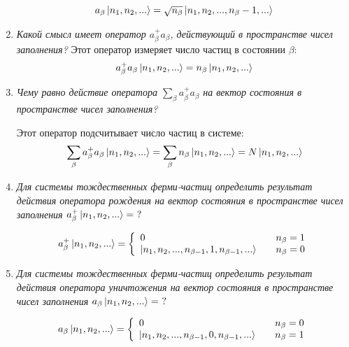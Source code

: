 \documentclass{article}
\begin{document}
\begin{enumerate}
	\begin{equation}
		a_\beta \ket{n_1, n_2, ...} = \sqrt{n_\beta} \ket{n_1, n_2, ..., n_\beta -1,...}
	\end{equation}
	
	\item \textit{Какой смысл имеет оператор $a^+_\beta a_\beta$, действующий в пространстве чисел заполнения?}
	Этот оператор измеряет число частиц в состоянии $\beta$:
	\begin{equation}
		a^+_\beta a_\beta \ket{n_1, n_2, ...} = n_\beta \ket{n_1, n_2, ...}
	\end{equation}
	
	\item \textit{Чему равно действие оператора $\sum\limits_{\beta}a^+_\beta a_\beta$ на вектор состояния в пространстве чисел заполнения?}
	
	Этот оператор подсчитывает число частиц в системе:
	\begin{equation}
		\sum\limits_{\beta}a^+_\beta a_\beta \ket{n_1, n_2, ...} =\sum\limits_{\beta} n_\beta \ket{n_1, n_2, ...} = N\ket{n_1, n_2, ...}
	\end{equation}
	\item \textit{Для системы тождественных ферми-частиц определить результат действия оператора рождения на вектор состояния в пространстве чисел заполнения $a^+_\beta \ket{n_1, n_2, ...} = \ ?$}
	
	\begin{equation}
		a^+_\beta \ket{n_1, n_2, ...} = \left\{ 
  \begin{array}{l l}
    0 & \quad n_\beta = 1\\
    \ket{n_1, n_2, ..., n_{\beta -1}, 1 , n_{\beta -1},...} & \quad n_\beta = 0
  \end{array} \right.
	\end{equation}
	
	\item \textit{Для системы тождественных ферми-частиц определить результат действия оператора уничтожения на вектор состояния в пространстве чисел заполнения $a_\beta \ket{n_1, n_2, ...} = \ ?$}
	
	\begin{equation}
		a_\beta \ket{n_1, n_2, ...} = \left\{ 
  \begin{array}{l l}
    0 & \quad n_\beta = 0\\
    \ket{n_1, n_2, ..., n_{\beta -1}, 0 , n_{\beta -1},...} & \quad n_\beta = 1
  \end{array} \right.
	\end{equation}
	

\end{enumerate}
\end{document}
